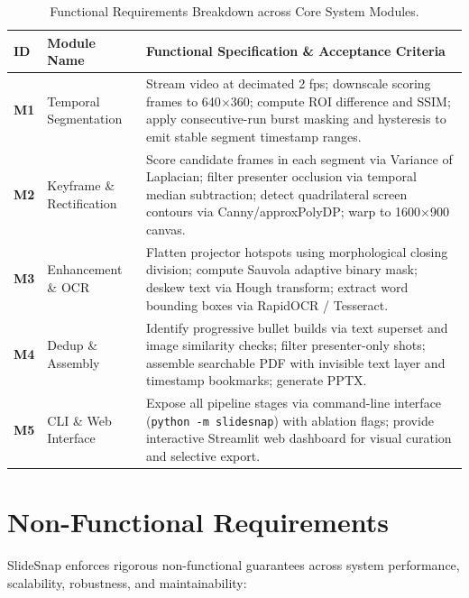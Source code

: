 \documentclass[10pt,a4paper]{article}
\begin{document}
\begin{table}[h!]
\small
\centering
\begin{tabularx}{\textwidth}{@{} l p{38mm} X @{}}
\toprule
\rowcolor{navy}\color{white}\textbf{ID} & \color{white}\textbf{Module Name} & \color{white}\textbf{Functional Specification \& Acceptance Criteria} \\
\midrule
\textbf{M1} & Temporal Segmentation & Stream video at decimated 2 fps; downscale scoring frames to 640$\times$360; compute ROI difference and SSIM; apply consecutive-run burst masking and hysteresis to emit stable segment timestamp ranges. \\
\textbf{M2} & Keyframe \& Rectification & Score candidate frames in each segment via Variance of Laplacian; filter presenter occlusion via temporal median subtraction; detect quadrilateral screen contours via Canny/approxPolyDP; warp to 1600$\times$900 canvas. \\
\textbf{M3} & Enhancement \& OCR & Flatten projector hotspots using morphological closing division; compute Sauvola adaptive binary mask; deskew text via Hough transform; extract word bounding boxes via RapidOCR / Tesseract. \\
\textbf{M4} & Dedup \& Assembly & Identify progressive bullet builds via text superset and image similarity checks; filter presenter-only shots; assemble searchable PDF with invisible text layer and timestamp bookmarks; generate PPTX. \\
\textbf{M5} & CLI \& Web Interface & Expose all pipeline stages via command-line interface (\texttt{python -m slidesnap}) with ablation flags; provide interactive Streamlit web dashboard for visual curation and selective export. \\
\bottomrule
\end{tabularx}
\caption{Functional Requirements Breakdown across Core System Modules.}
\end{table}

\section{Non-Functional Requirements}

SlideSnap enforces rigorous non-functional guarantees across system performance, scalability, robustness, and maintainability:
\end{document}
